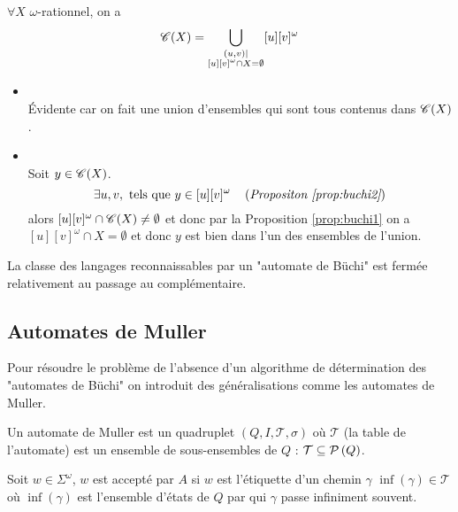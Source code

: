\begin{theorem}
	$\forall X$ $\omega$-rationnel, on a
	$$ \mathscr{C}(X) = \bigcup_{ \substack{ (u,v) \mid \\ [u][v]^{\omega} \cap X = \emptyset} } [u][v]^{\omega}$$
\end{theorem}

\begin{proofI}
	\begin{itemize}
		\item \fbox{$\supseteq$} \\
		      Évidente car on fait une union d'ensembles qui sont tous contenus dans $\mathscr{C} (X)$.
		\item \fbox{$\subseteq$} \\
		      Soit $y \in \mathscr{C} (X)$.
		      $$\exists u,v,\text{ tels que } y \in [u][v]^{\omega} \quad\left(\textit{Propositon \ref{prop:buchi2}}\right)$$
		      alors $[u][v]^{\omega} \cap \mathscr{C} (X) \neq \emptyset$ et donc par la  Proposition \ref{prop:buchi1}
		      on a $[u][v]^{\omega} \cap X = \emptyset$ et donc $y$ est bien dans l'un des ensembles de l'union.
	\end{itemize}
\end{proofI}

\begin{coro}
	La classe des langages reconnaissables par un "automate de Büchi" est fermée relativement au passage au complémentaire.
\end{coro}


\subsection{Automates de Muller}

Pour résoudre le problème de l'absence d'un algorithme de détermination des "automates de Büchi" on introduit des
généralisations comme les automates de Muller.

\begin{definition}
	Un automate de Muller est un quadruplet $(Q,I, \mathcal T, \sigma)$ où $\mathcal T$ (la table de l'automate) est un ensemble de sous-ensembles
	de $Q$ : $\mathcal T \subseteq \mathcal{P}\left(Q\right)$.

	Soit $w \in \Sigma^{\omega}$, $w$ est accepté par $A$ si $w$ est l'étiquette d'un chemin $\gamma$ \tq $\inf ({\gamma}) \in \mathcal T$ où
	$\inf ({\gamma})$ est l'ensemble d'états de $Q$ par qui $\gamma$ passe infiniment souvent.
\end{definition}


